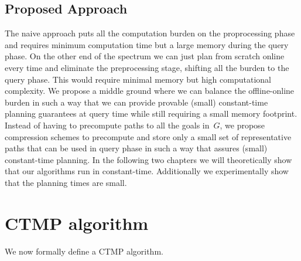 \documentclass[a4paper]{report}
\begin{document}
\subsection{Proposed Approach}
The naive approach puts all the computation burden on the proprocessing phase and requires minimum computation time but a large memory during the query phase. On the other end of the spectrum we can just plan from scratch online every time and eliminate the preprocessing stage, shifting all the burden to the query phase. This would require minimal memory but high computational complexity. We propose a middle ground where we can balance the offline-online burden in such a way that we can provide provable (small) constant-time planning guarantees at query time while still requiring a small memory footprint. Instead of having to precompute paths to all the goals in~$G$, we propose compression schemes to precompute and store only a small set of representative paths that can be used in query phase in such a way that assures (small) constant-time planning. In the following two chapters we will theoretically show that our algorithms run in constant-time. Additionally we experimentally show that the planning times are small.

\section{CTMP algorithm}
\label{subsec:ctmp_alg}

We now formally define a CTMP algorithm.
%

\vspace{2mm}
\end{document}
